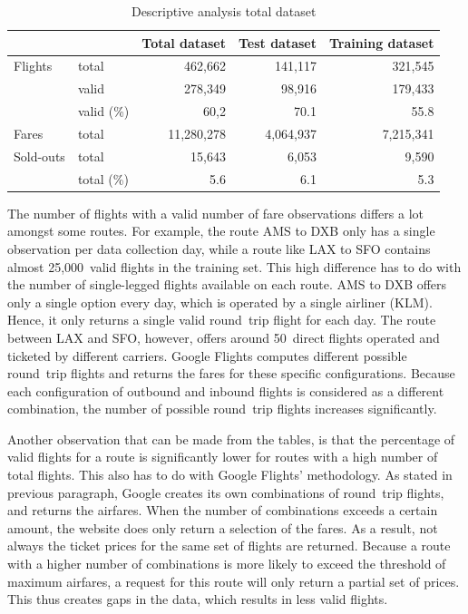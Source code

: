 \begin{table}
\centering
\footnotesize
\begin{tabular}{l l r r r}
    \toprule
    ~         &  ~          &  Total dataset  & Test dataset  &  Training dataset \\
    \midrule
    Flights   &  total      &  462,662    &  141,117    & 321,545 \\
    ~         &  valid      &  278,349    &  98,916     & 179,433 \\
    ~         &  valid (\%) &  60,2       &  70.1       & 55.8 \\
    Fares     &  total      &  11,280,278 &  4,064,937  & 7,215,341 \\
    Sold-outs &  total      &  15,643     &  6,053      & 9,590 \\
    ~         &  total (\%) &  5.6        &  6.1        &  5.3 \\
    \bottomrule
\end{tabular}
\caption{Descriptive analysis total dataset}
\label{tbl:DescriptiveAnalysisTotalDataset}
\end{table}



The number of flights with a valid number of fare observations differs a lot amongst some routes. For example, the route AMS to DXB only has a single observation per data collection day, while a route like LAX to SFO contains almost 25,000~valid flights in the training set. This high difference has to do with the number of single-legged flights available on each route. AMS to DXB offers only a single option every day, which is operated by a single airliner (KLM). Hence, it only returns a single valid round~trip flight for each day. The route between LAX and SFO, however, offers around 50~direct flights operated and ticketed by different carriers. Google Flights computes different possible round~trip flights and returns the fares for these specific configurations. Because each configuration of outbound and inbound flights is considered as a different combination, the number of possible round~trip flights increases significantly.

Another observation that can be made from the tables, is that the percentage of valid flights for a route is significantly lower for routes with a high number of total flights. This also has to do with Google Flights' methodology. As stated in previous paragraph, Google creates its own combinations of round~trip flights, and returns the airfares. When the number of combinations exceeds a certain amount, the website does only return a selection of the fares. As a result, not always the ticket prices for the same set of flights are returned. Because a route with a higher number of combinations is more likely to exceed the threshold of maximum airfares, a request for this route will only return a partial set of prices. This thus creates gaps in the data, which results in less valid flights.

